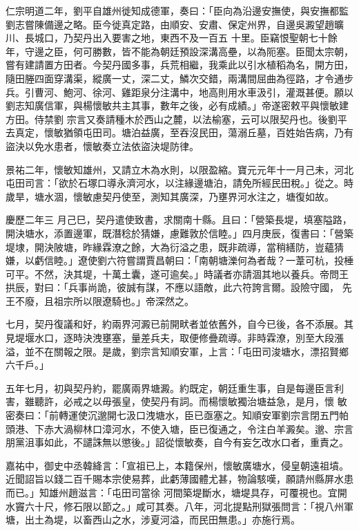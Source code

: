 \begin{pinyinscope}
 仁宗明道二年，劉平自雄州徙知成德軍，奏曰：「臣向為沿邊安撫使，與安撫都監劉志嘗陳備邊之略。臣今徙真定路，由順安、安肅、保定州界，自邊吳澱望趙曠川、長城口，乃契丹出入要害之地，東西不及一百五
 十里。臣竊恨聖朝七十餘年，守邊之臣，何可勝數，皆不能為朝廷預設深溝高壘，以為阨塞。臣聞太宗朝，嘗有建請置方田者。今契丹國多事，兵荒相繼，我乘此以引水植稻為名，開方田，隨田塍四面穿溝渠，縱廣一丈，深二丈，鱗次交錯，兩溝間屈曲為徑路，才令通步兵。引曹河、鮑河、徐河、雞距泉分注溝中，地高則用水車汲引，灌溉甚便。願以劉志知廣信軍，與楊懷敏共主其事，數年之後，必有成績。」帝遂密敕平與懷敏建方田。侍禁劉
 宗言又奏請種木於西山之麓，以法榆塞，云可以限契丹也。後劉平去真定，懷敏猶領屯田司。塘泊益廣，至吞沒民田，蕩溺丘墓，百姓始告病，乃有盜決以免水患者，懷敏奏立法依盜決堤防律。



 景祐二年，懷敏知雄州，又請立木為水則，以限盈縮。寶元元年十一月己未，河北屯田司言：「欲於石塚口導永濟河水，以注緣邊塘泊，請免所經民田稅。」從之。時歲旱，塘水涸，懷敏慮契丹使至，測知其廣深，乃壅界河水注之，塘復如故。



 慶歷二年三
 月己巳，契丹遣使致書，求關南十縣。且曰：「營築長堤，填塞隘路，開決塘水，添置邊軍，既潛稔於猜嫌，慮難敦於信睦。」四月庚辰，復書曰：「營築堤埭，開決陂塘，昨緣霖潦之餘，大為衍溢之患，既非疏導，當稍繕防，豈蘊猜嫌，以虧信睦。」遼使劉六符嘗謂賈昌朝曰：「南朝塘濼何為者哉？一葦可杭，投棰可平。不然，決其堤，十萬土囊，遂可逾矣。」時議者亦請涸其地以養兵。帝問王拱辰，對曰：「兵事尚詭，彼誠有謀，不應以語敵，此六符誇言爾。設險守國，
 先王不廢，且祖宗所以限遼騎也。」帝深然之。



 七月，契丹復議和好，約兩界河澱已前開畎者並依舊外，自今已後，各不添展。其見堤堰水口，逐時決洩壅塞，量差兵夫，取便修疊疏導。非時霖潦，別至大段漲溢，並不在關報之限。是歲，劉宗言知順安軍，上言：「屯田司浚塘水，漂招賢鄉六千戶。」



 五年七月，初與契丹約，罷廣兩界塘澱。約既定，朝廷重生事，自是每邊臣言利害，雖聽許，必戒之以毋張皇，使契丹有詞。而楊懷敏獨治塘益急，是月，懷
 敏密奏曰：「前轉運使沉邈開七汲口洩塘水，臣已亟塞之。知順安軍劉宗言閉五門帕頭港、下赤大渦柳林口漳河水，不使入塘，臣已復通之，令注白羊澱矣。邈、宗言朋黨沮事如此，不譴誅無以懲後。」詔從懷敏奏，自今有妄乞改水口者，重責之。



 嘉祐中，御史中丞韓絳言：「宣祖已上，本籍保州，懷敏廣塘水，侵皇朝遠祖墳。近聞詔旨以錢二百千賜本宗使易葬，此虧薄國體尤甚，物論駭嘆，願請州縣屏水患而已。」知雄州趙滋言：「屯田司當徐
 河間築堤斷水，塘堤具存，可覆視也。宜開水竇六十尺，修石限以節之。」咸可其奏。八年，河北提點刑獄張問言：「視八州軍塘，出土為堤，以畜西山之水，涉夏河溢，而民田無患。」亦施行焉。




\end{pinyinscope}
